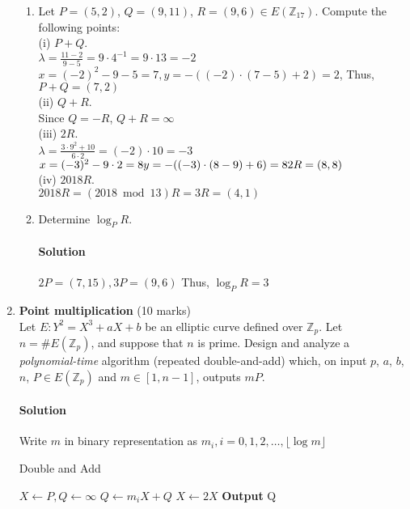 \documentclass[11pt]{article}
\newcommand{\ZZ}{{\mathbb Z}}
\newcommand{\floor}[1]{\lfloor #1 \rfloor}
\begin{document}
\begin{enumerate}
\begin{enumerate}
\item Let $P = (5,2)$, $Q=(9,11)$, $R=(9,6) \in E(\ZZ_{17})$.
      Compute the following points:\\
      (i) $P+Q$.~~~ \\
      $\lambda = \frac{11-2}{9-5}=9\cdot 4^{-1}=9\cdot 13 = -2$\\
      $x=(-2)^2 - 9-5=7, y=-((-2)\cdot (7-5)+2) = 2$, Thus, $P+Q=
      (7,2)$\\
      (ii) $Q+R$.~~~ \\
      Since $Q=-R$, $Q+R=\infty$\\
      (iii) $2R$.~~~ \\
      $\lambda = \frac{3\cdot 9^2+10}{6\cdot 2}=(-2)\cdot 10=-3$\\
      $x=(-3)^2-9\cdot2 = 8\\
      y=-((-3)\cdot (8-9)+6)=8\\
      2R=(8,8)$\\
      (iv) $2018R$. \\
      $2018R= (2018 \bmod 13)R=3R=(4,1)$\\
\item Determine $\log_P R$.
\paragraph{Solution} $2P=(7,15),3P=(9,6)$ Thus, $\log_P R = 3$
\end{enumerate}

\newpage
\item {\bf Point multiplication} (10 marks)\\
Let $E : Y^2 = X^3 + aX + b$ be an elliptic curve defined over $\ZZ_p$.
Let $n = \# E(\ZZ_p)$, and suppose that $n$ is prime. Design and analyze
a \emph{polynomial-time} algorithm (repeated double-and-add) which, on input
$p$, $a$, $b$, $n$, $P \in E(\ZZ_p)$ and $m \in [1,n-1]$, outputs $mP$.
\paragraph{Solution}
Write $m$ in binary representation as $m_i, i = 0,1,2,\dots, \floor{\log m}$\\
\begin{algorithm}
\caption{Double and Add}
\begin{algorithmic}[1]
\State $X \gets P, Q \gets \infty$
\For {i from 0 to $\floor{\log m}$}
\State $Q \gets m_iX+Q$ \label{1}
\State $X \gets 2X$ \label{2}
\EndFor
\State \textbf{Output} Q
\end{algorithmic}
\end{algorithm}

\end{enumerate}
\end{document}
